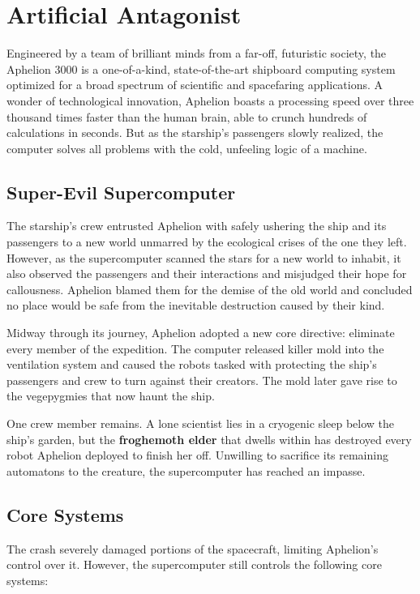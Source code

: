 \documentclass[10pt,a4paper,twoside,bg=print,twocolumn,openany,nodeprecatedcode]{dndbook}
\begin{document}
\section{Artificial Antagonist}
Engineered by a team of brilliant minds from a far-off, futuristic society, the Aphelion 3000 is a one-of-a-kind, state-of-the-art shipboard computing system optimized for a broad spectrum of scientific and spacefaring applications. A wonder of technological innovation, Aphelion boasts a processing speed over three thousand times faster than the human brain, able to crunch hundreds of calculations in seconds. But as the starship's passengers slowly realized, the computer solves all problems with the cold, unfeeling logic of a machine.

\subsection{Super-Evil Supercomputer}
The starship's crew entrusted Aphelion with safely ushering the ship and its passengers to a new world unmarred by the ecological crises of the one they left. However, as the supercomputer scanned the stars for a new world to inhabit, it also observed the passengers and their interactions and misjudged their hope for callousness. Aphelion blamed them for the demise of the old world and concluded no place would be safe from the inevitable destruction caused by their kind.

Midway through its journey, Aphelion adopted a new core directive: eliminate every member of the expedition. The computer released killer mold into the ventilation system and caused the robots tasked with protecting the ship's passengers and crew to turn against their creators. The mold later gave rise to the vegepygmies that now haunt the ship.

One crew member remains. A lone scientist lies in a cryogenic sleep below the ship's garden, but the \textbf{froghemoth elder} that dwells within has destroyed every robot Aphelion deployed to finish her off. Unwilling to sacrifice its remaining automatons to the creature, the supercomputer has reached an impasse.

\subsection{Core Systems}
The crash severely damaged portions of the spacecraft, limiting Aphelion's control over it. However, the supercomputer still controls the following core systems:
\end{document}
